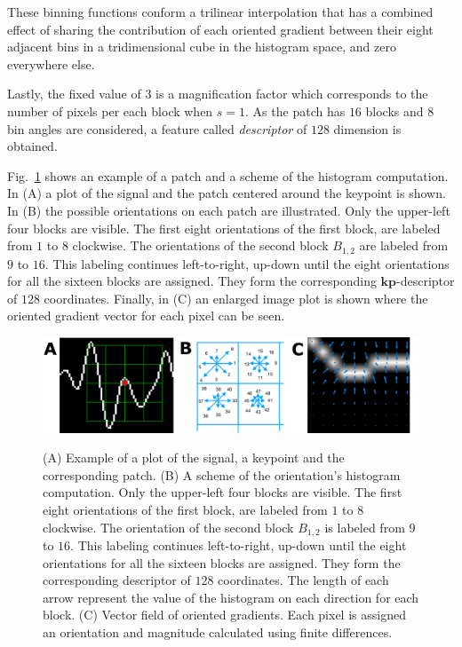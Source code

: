 These binning functions conform a trilinear interpolation that has a combined effect of sharing the contribution of each oriented gradient between their eight adjacent bins in a tridimensional cube in the histogram space, and zero everywhere else.

Lastly, the fixed value of $ 3 $ is a magnification factor which corresponds to the number of pixels per each block when $s = 1$.  As the patch has  $16$ blocks and  $8$ bin angles are considered, a feature called \textit{descriptor} of $128$ dimension is obtained. 

Fig.~\ref{fig:sampledescriptor} shows an example of a patch and a scheme of the histogram computation. In (A) a plot of the signal and the patch centered around the keypoint is shown. In (B) the possible orientations on each patch are illustrated.  Only the upper-left four blocks are visible.  The first eight orientations of the first block, are labeled from $1$ to $8$ clockwise. The orientations of the second block $ B_{1,2} $ are labeled from $9$ to $16$.  This labeling continues left-to-right, up-down until the eight orientations for all the sixteen blocks are assigned. They form the corresponding $\mathbf{kp}$-descriptor of $128$ coordinates. Finally, in (C) an enlarged image plot is shown where the oriented gradient vector for each pixel can be seen.

\begin{figure}[h!]
\centering
\includegraphics[width=16cm]{images/gradients.png}\label{samplegradients}
\caption[Histogram of Gradient Orientations for ERP]{ (A) Example of a plot of the signal, a keypoint and the corresponding patch. (B) A scheme of the orientation's histogram computation.  Only the upper-left four blocks are visible.  The first eight orientations of the first block, are labeled from $1$ to $8$ clockwise. The orientation of the second block $ B_{1,2} $ is labeled from $9$ to $16$.  This labeling continues left-to-right, up-down until the eight orientations for all the sixteen blocks are assigned. They form the corresponding descriptor of $128$ coordinates.  The length of each arrow represent the value of the histogram on each direction for each block. (C) Vector field of oriented gradients.  Each pixel is assigned an orientation and magnitude calculated  using finite differences. }
\label{fig:sampledescriptor}
\end{figure}

